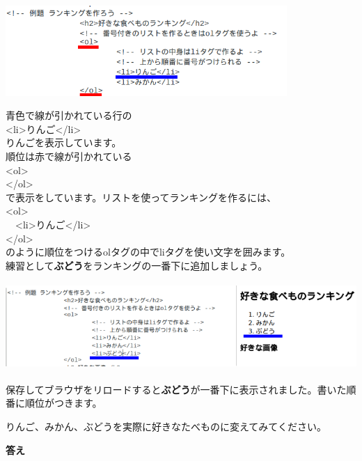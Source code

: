 \documentclass[a4paper,12pt]{jarticle}
\begin{document}
\bigskip


\includegraphics[width=10.694cm,height=3.431cm]{textbook-img181.png}


青色で線が引かれている行の\\
{\textless}li{\textgreater}りんご{\textless}/li{\textgreater}\\
りんごを表示しています。\\
順位は赤で線が引かれている\\
{\textless}ol{\textgreater}\\
{\textless}/ol{\textgreater}\\
で表示をしています。リストを使ってランキングを作るには、\\
{\textless}ol{\textgreater}\\
\ \ {\textless}li{\textgreater}りんご{\textless}/li{\textgreater}\\
{\textless}/ol{\textgreater}\\
のように順位をつけるolタグの中でliタグを使い文字を囲みます。\\
練習として\textbf{ぶどう}をランキングの一番下に追加しましょう。\\


\bigskip


\includegraphics[width=15cm,height=3.327cm]{textbook-img183.png}


\bigskip


保存してブラウザをリロードすると\textbf{ぶどう}が一番下に表示されました。書いた順番に順位がつきます。

りんご、みかん、ぶどうを実際に好きなたべものに変えてみてください。


\bigskip
\clearpage
\textbf{答え}


\bigskip
\end{document}
